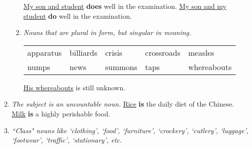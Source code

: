 \begin{enumerate}
\begin{enumerate}
                \underline{My son and student} \textbf{does} well in the examination.
                \newline
                \underline{My son and my student} \textbf{do} well in the
                examination.
            \item {\it Nouns that are plural in form, but singular in meaning.}
                \newline
                \begin{tabular}{lllll}
                    apparatus & billiards & crisis & crossroads & measles \\
                    numps & news & summons & taps & whereabouts
                \end{tabular}
                \newline
                \newline
                \underline{His whereabouts} is still unknown.
        \end{enumerate}
    \item
        {\it
        The subject is an uncountable noun.
        }
        \newline
        \newline
        \underline{Rice} \textbf{is} the daily diet of the Chinese.
        \newline
        \newline
        \underline{Milk} \textbf{is} a highly perishable food.
    \item
        {\it ``Class" nouns like `clothing', `food', `furniture', `crockery',
        `cutlery', `luggage', `footwear', `traffic', `stationary', etc.
        }
\end{enumerate}
